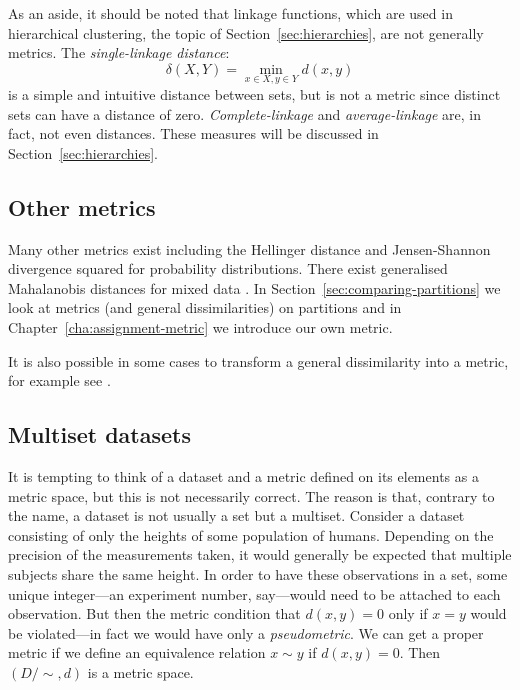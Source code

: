 \documentclass[a4paper]{report}
\newcommand{\dset}{D}
\begin{document}
As an aside, it should be noted that linkage functions, which are used in
hierarchical clustering, the topic of Section~\ref{sec:hierarchies}, are not
generally metrics.  The \textit{single-linkage distance}:
\begin{equation*}
  \delta(X,Y) = \min_{x \in X, y \in Y} d(x,y)
\end{equation*}
is a simple and intuitive distance between sets, but is not a metric since
distinct sets can have a distance of zero.  \textit{Complete-linkage} and
\textit{average-linkage} are, in fact, not even distances.  These measures
will be discussed in Section~\ref{sec:hierarchies}.

\subsection{Other metrics}
\label{sec:other-metrics}

Many other metrics exist including the Hellinger distance and Jensen-Shannon
divergence squared \citep{endres03metric} for probability distributions.
There exist generalised Mahalanobis distances for mixed data
\citep{leon2005generalized}.  In Section~\ref{sec:comparing-partitions} we
look at metrics (and general dissimilarities) on partitions and in
Chapter~\ref{cha:assignment-metric} we introduce our own metric.

It is also possible in some cases to transform a general dissimilarity into a
metric, for example see \citet[chap. 2.5]{everitt80}.

\subsection{Multiset datasets}
\label{sec:multiset-datasets}

It is tempting to think of a dataset and a metric defined on its elements as a
metric space, but this is not necessarily correct.  The reason is that,
contrary to the name, a dataset is not usually a set but a multiset.  Consider
a dataset consisting of only the heights of some population of humans.
Depending on the precision of the measurements taken, it would generally be
expected that multiple subjects share the same height.  In order to have these
observations in a set, some unique integer---an experiment number, say---would
need to be attached to each observation.  But then the metric condition that
$d(x,y)=0$ only if $x=y$ would be violated---in fact we would have only a
\textit{pseudometric}.  We can get a proper metric if we define an equivalence
relation $x \sim y$ if $d(x,y)=0$.  Then $(\dset/\sim,d)$ is a metric space.
\end{document}
